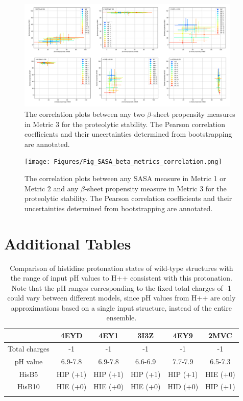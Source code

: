 \documentclass[sn-vancouver]{sn-jnl}
\begin{document}
\begin{figure}[H]
\centering
\includegraphics[width=0.95\textwidth]{Figures/Fig_beta_metrics_correlation.png}
\caption{The correlation plots between any two $\beta$-sheet propensity measures in Metric 3 for the proteolytic stability. The Pearson correlation coefficients and their uncertainties determined from bootstrapping are annotated.}
\label{corr_2}
\end{figure}

\begin{figure}[H]
\centering
\texttt{[image: Figures/Fig\_SASA\_beta\_metrics\_correlation.png]}
\caption{The correlation plots between any SASA measure in Metric 1 or Metric 2 and any $\beta$-sheet propensity measure in Metric 3 for the proteolytic stability. The Pearson correlation coefficients and their uncertainties determined from bootstrapping are annotated.}
\label{corr_3}
\end{figure}


\section{Additional Tables}

\renewcommand{\thetable}{S\arabic{table}}
\begin{table}[ht]
\begin{minipage}{\textwidth}
\caption{Comparison of histidine protonation states of wild-type structures with the range of input pH values to H++ consistent with this protonation. Note that the pH ranges corresponding to the fixed total charges of -1 could vary between different models, since pH values from H++ are only approximations based on a single input structure, instead of the entire ensemble.}
\label{supple_tab: protonation}
\centering
\begin{tabular}{@{}cccccc@{}}

\toprule
     & 4EYD & 4EY1 & 3I3Z & 4EY9 & 2MVC \\
\midrule
Total charges & -1 & -1 & -1 & -1 & -1 \\
pH value & 6.9-7.8 & 6.9-7.8 & 6.6-6.9 & 7.7-7.9 & 6.5-7.3 \\
HisB5 & HIP (+1) &HIP (+1) &HIP (+1) &HIP (+1) & HIE (+0) \\
HisB10 & HIE (+0) & HIE (+0) &HIE (+0) &HID (+0) & HIP (+1)  \\
\botrule
\end{tabular}
\end{minipage}
\end{table}
\end{document}
